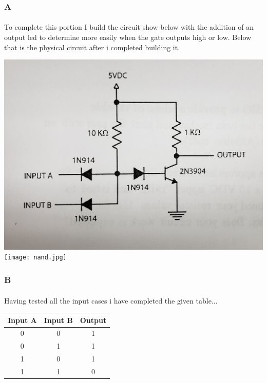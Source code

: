 \documentclass[12pt]{article}
\begin{document}
			\subsubsection{A}
				\paragraph{}
					To complete this portion I build the circuit show below with the addition of an output led to determine more easily
					when the gate outputs high or low.  Below that is the physical circuit after i completed building it.

					\begin{center}
						\includegraphics[scale=0.05]{2.jpg}\\
						\vspace{1cm}
						\texttt{[image: nand.jpg]}\\
					\end{center}
			
			\subsubsection{B}
				\paragraph{}
					Having tested all the input cases i have completed the given table...
				
					\begin{center}
						\begin{tabular}{| c | c | c |}
							\hline
							Input A & Input B & Output\\
							\hline
							0 & 0 & 1\\
							0 & 1 & 1\\
							1 & 0 & 1\\
							1 & 1 & 0\\
							\hline
						\end{tabular}
					\end{center}
				
\end{document}
